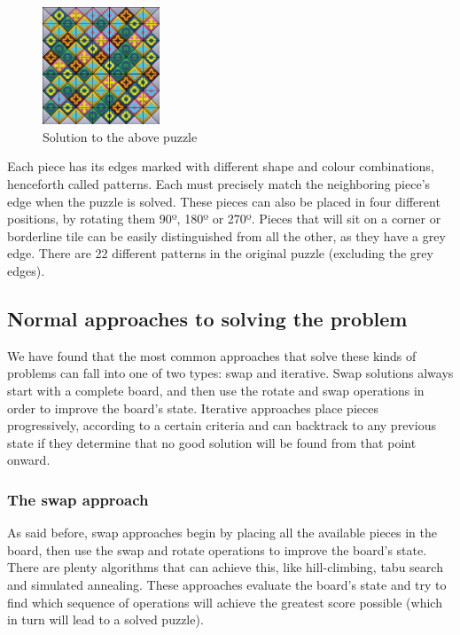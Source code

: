 \documentclass{llncs}
\begin{document}
\begin{figure}[h]
	\centering
	\includegraphics[width=35mm]{images/solved.png}
	\caption{Solution to the above puzzle}
	\label{fig:solved_example}
\end{figure}

Each piece has its edges marked with different shape and colour combinations, henceforth called patterns. Each must precisely match the neighboring piece's edge when the puzzle is solved. These pieces can also be placed in four different positions, by rotating them 90º, 180º or 270º. Pieces that will sit on a corner or borderline tile can be easily distinguished from all the other, as they have a grey edge. There are 22 different patterns in the original puzzle (excluding the grey edges).

\subsection{Normal approaches to solving the problem}\label{sec:normal_approaches}

We have found that the most common approaches that solve these kinds of problems can fall into one of two types: swap and iterative. Swap solutions always start with a complete board, and then use the rotate and swap operations in order to improve the board's state. Iterative approaches place pieces progressively, according to a certain criteria and can backtrack to any previous state if they determine that no good solution will be found from that point onward.

\subsubsection{The swap approach}\label{sec:swap_approach}

As said before, swap approaches begin by placing all the available pieces in the board, then use the swap and rotate operations to improve the board's state. There are plenty algorithms that can achieve this, like hill-climbing, tabu search and simulated annealing. These approaches evaluate the board's state and try to find which sequence of operations will achieve the greatest score possible (which in turn will lead to a solved puzzle).
\end{document}
